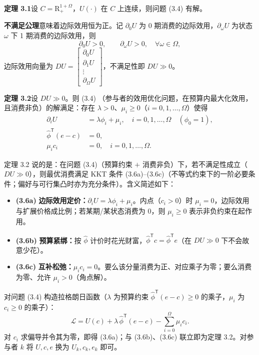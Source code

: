 \begin{tcolorbox}[knowledge,title=3.4 参与者的优化]
\begin{tcolorbox}[knowledge]
\textbf{定理 3.1}\quad 设 $C=\mathrm{R}^{1+\Omega}_{+}$，$U(\cdot)$ 在 $C$ 上连续，则问题 (3.4) 有解。
\end{tcolorbox}

\textbf{不满足公理}意味着边际效用恒为正。记 $\partial_0 U$ 为 0 期消费的边际效用，$\partial_{\omega}U$ 为状态 $\omega$ 下 1 期消费的边际效用，则
\[
    \partial_0 U>0,\qquad \partial_{\omega}U>0,\quad\forall\omega\in\Omega,
    \tag{3.5}
\]
边际效用向量为 $DU=\begin{bmatrix}\partial_0 U \\ \partial_1 U \\ \vdots \\ \partial_{\Omega}U\end{bmatrix}$，不满足性即 $DU\gg 0$。

\begin{tcolorbox}[knowledge]
\textbf{定理 3.2}\quad 设 $DU\gg 0$。则 (3.4) （参与者的效用优化问题，在预算内最大化效用，且消费非负）的解满足：存在 $\lambda>0$、$\mu_i\ge 0$（$i=0,1,\dots,\Omega$）使得
\begin{align}
    \partial_i U&=\lambda\phi_i+\mu_i,\quad i=0,1,\dots,\Omega\quad(\phi_0=1),\tag{3.6a}\\
    \hat{\phi}^{\mathsf T}(e-c)&=0,\tag{3.6b}\\
    \mu_i c_i&=0,\quad i=0,1,\dots,\Omega.\tag{3.6c}
\end{align}


定理 3.2 说的是：在问题 (3.4)（预算约束 $+$ 消费非负）下，若不满足性成立（$DU\gg 0$），则最优消费满足 KKT 条件 (3.6a)–(3.6c)（不等式约束下的一阶必要条件；偏好与可行集凸时亦为充分条件）。含义简述如下：
\begin{itemize}
    \item \textbf{(3.6a)} \textbf{边际效用定价：}$\partial_i U=\lambda\phi_i+\mu_i$。内点（$c_i>0$）时 $\mu_i=0$，边际效用与扩展价格成比例；若某期/某状态消费为 $0$，则 $\mu_i\ge 0$ 表示非负约束在起作用。
    \item \textbf{(3.6b)} \textbf{预算紧绑：}按 $\hat{\phi}$ 计价时花光财富，$\hat{\phi}^{\mathsf T}c=\hat{\phi}^{\mathsf T}e$（在 $DU\gg 0$ 下不会故意少花）。
    \item \textbf{(3.6c)} \textbf{互补松弛：}$\mu_i c_i=0$。要么该分量消费为正、对应乘子为零；要么消费为零、允许 $\mu_i>0$（角点解）。
\end{itemize}
\end{tcolorbox}

对问题 (3.4) 构造拉格朗日函数（$\lambda$ 为预算约束 $\hat{\phi}^{\mathsf T}(e-c)\ge 0$ 的乘子，$\mu_i$ 为 $c_i\ge 0$ 的乘子）：
\[
    \mathcal{L}
    =U(c)+\lambda\,\hat{\phi}^{\mathsf T}(e-c)-\sum_{i=0}^{\Omega}\mu_i c_i.
\]
对 $c_i$ 求偏导并令其为零，即得 (3.6a)；与 (3.6b)、(3.6c) 联立即为定理 3.2。对参与者 $k$ 将 $U,c,e$ 换为 $U_k,c_k,e_k$ 即可。


\end{tcolorbox}

